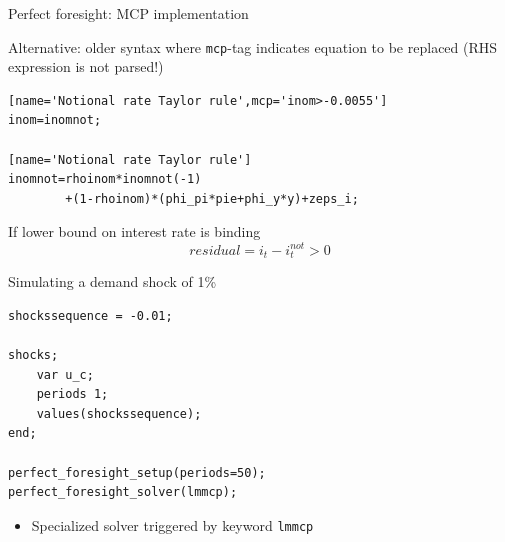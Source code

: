 \begin{frame}[fragile]{Perfect foresight: MCP implementation}
\begin{wideitemize}
\item Alternative: older syntax where \texttt{mcp}-tag indicates equation to be replaced (RHS expression is not parsed!)
\begin{verbatim}
[name='Notional rate Taylor rule',mcp='inom>-0.0055']
inom=inomnot;

[name='Notional rate Taylor rule']
inomnot=rhoinom*inomnot(-1)
        +(1-rhoinom)*(phi_pi*pie+phi_y*y)+zeps_i;
\end{verbatim}
\item If lower bound on interest rate is binding
\begin{equation}
  residual=i_t-i_t^{not}>0
\end{equation}

\end{wideitemize}
\end{frame}


\begin{frame}[fragile]{Simulating a demand shock of 1\%}
\begin{verbatim}
shockssequence = -0.01;

shocks;
    var u_c;
    periods 1;
    values(shockssequence);
end;

perfect_foresight_setup(periods=50);
perfect_foresight_solver(lmmcp);
\end{verbatim}
\begin{itemize}
\item Specialized solver triggered by keyword \texttt{lmmcp}
\end{itemize}
\end{frame}

%
%
%
%
%
%
%
%



